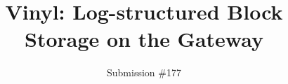 \documentclass[letterpaper,twocolumn,10pt]{article}
\begin{document}
\date{}

\title{\Large \bf
	Vinyl: Log-structured Block Storage on the Gateway\\}

\author{Submission \#177}

\maketitle













\end{document}
